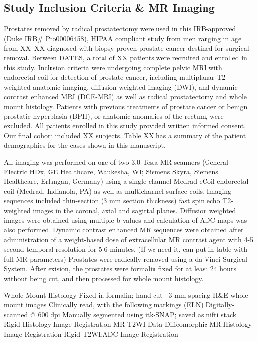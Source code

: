 \subsection{Study Inclusion Criteria \& MR Imaging}
Prostates removed by radical prostatectomy were used in this IRB-approved (Duke
IRB# Pro00006458), HIPAA compliant study from men ranging in age from XX--XX
diagnosed with biopsy-proven prostate cancer destined for surgical removal.
Between DATES, a total of XX patients were recruited and enrolled in this
study. Inclusion criteria were undergoing complete pelvic MRI with endorectal
coil for detection of prostate cancer, including multiplanar T2-weighted
anatomic imaging, diffusion-weighted imaging (DWI), and dynamic contrast
enhanced MRI (DCE-MRI) as well as radical prostatectomy and whole mount
histology. Patients with previous treatments of prostate cancer or benign
prostatic hyperplasia (BPH), or anatomic anomalies of the rectum, were
excluded.  All patients enrolled in this study provided written informed
consent. Our final cohort included XX subjects. Table XX has a summary of the
patient demographics for the cases shown in this manuscript.  

All imaging was performed on one of two 3.0 Tesla MR scanners (General Electric
HDx, GE Healthcare, Waukesha, WI;  Siemens Skyra, Siemens Healthcare, Erlangan,
Germany) using a single channel Medrad eCoil endorectal coil (Medrad,
Indianola, PA) as well as multichannel surface coils.  Imaging sequences
included thin-section (3 mm section thickness) fast spin echo T2-weighted
images in the coronal, axial and sagittal planes.  Diffusion weighted images
were obtained using multiple b-values and calculation of ADC maps was also
performed.  Dynamic contrast enhanced MR sequences were obtained after
administration of a weight-based dose of extracellular MR contrast agent with
4-5 second temporal resolution for 5-6 minutes. (If we need it, can put in
table with full MR parameters) Prostates were radically removed using a da
Vinci Surgical System.  After exision, the prostates were formalin fixed for at
least 24 hours without being cut, and then processed for whole mount histology.

Whole Mount Histology
Fixed in formalin; hand-cut ~3 mm spacing
H&E whole-mount images
Clinically read, with the following markings (ELN)
Digitally-scanned @ 600 dpi
Manually segmented using itk-SNAP; saved as nifti stack
Rigid Histology Image Registration
MR T2WI Data
Diffeomorphic MR:Histology Image Registration
Rigid T2WI:ADC Image Registration
